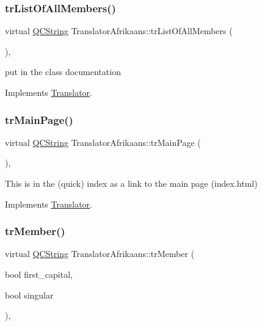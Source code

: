 \subsubsection{\texorpdfstring{trListOfAllMembers()}{trListOfAllMembers()}}
{\footnotesize\ttfamily virtual \mbox{\hyperlink{class_q_c_string}{Q\+C\+String}} Translator\+Afrikaans\+::tr\+List\+Of\+All\+Members (\begin{DoxyParamCaption}{ }\end{DoxyParamCaption})\hspace{0.3cm}{\ttfamily [inline]}, {\ttfamily [virtual]}}

put in the class documentation 

Implements \mbox{\hyperlink{class_translator}{Translator}}.

\mbox{\label{class_translator_afrikaans_ac77db9a79f9fc564629613f8c428dfe4}} 
\subsubsection{\texorpdfstring{trMainPage()}{trMainPage()}}
{\footnotesize\ttfamily virtual \mbox{\hyperlink{class_q_c_string}{Q\+C\+String}} Translator\+Afrikaans\+::tr\+Main\+Page (\begin{DoxyParamCaption}{ }\end{DoxyParamCaption})\hspace{0.3cm}{\ttfamily [inline]}, {\ttfamily [virtual]}}

This is in the (quick) index as a link to the main page (index.\+html) 

Implements \mbox{\hyperlink{class_translator}{Translator}}.

\mbox{\label{class_translator_afrikaans_a0933b64b76e83f7d651b1c702246a04d}} 
\subsubsection{\texorpdfstring{trMember()}{trMember()}}
{\footnotesize\ttfamily virtual \mbox{\hyperlink{class_q_c_string}{Q\+C\+String}} Translator\+Afrikaans\+::tr\+Member (\begin{DoxyParamCaption}\item[{bool}]{first\+\_\+capital,  }\item[{bool}]{singular }\end{DoxyParamCaption})\hspace{0.3cm}{\ttfamily [inline]}, {\ttfamily [virtual]}}

